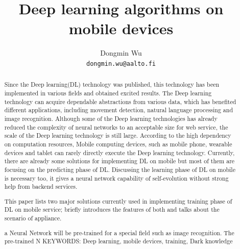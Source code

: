 \documentclass[article]{aaltoseries}
\begin{document}
 

\title{Deep learning algorithms on mobile devices}

\author{Dongmin Wu
\\\textnormal{\texttt{dongmin.wu@aalto.fi}}} %


\maketitle


\begin{abstract}


  Since the Deep learning(DL) technology was published, this technology has been
  implemented in various fields and obtained excited results. The Deep learning technology can acquire 
  dependable abstractions from various data, which has benefited different applications, 
  including movement detection, natural language processing and image recognition. 
  Although some of the Deep learning technologies 
  has already reduced the complexity of neural networks to an acceptable size for web service, the 
 scale of the Deep learning technology is still large. 
 According to the high dependency on computation resources,
 Mobile computing devices, such as mobile phone,
  wearable devices and tablet can rarely directly execute the Deep learning technology. 
 Currently, there are already some solutions for implementing DL on mobile\cite{Ota:2017}
 but most of them are focusing on the predicting phase of DL. 
 Discussing the learning phase of DL on mobile is necessary too, 
 it gives a neural network capability of self-evolution without strong help from backend services.

 This paper lists two major solutions currently used in implementing training phase of DL on mobile service;
 briefly introduces the features of both and talks about the scenario of appliance. 



 a Neural Network will be pre-trained for a special field such as image recognition. 
 The pre-trained N
\vspace{3mm}
\noindent KEYWORDS: Deep learning, mobile devices, training, Dark knowledge

\end{abstract}
\end{document}
